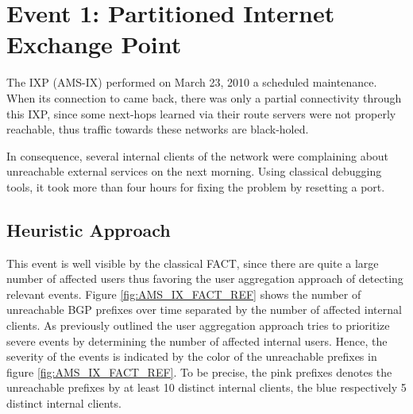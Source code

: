 \section{Event 1: Partitioned Internet Exchange Point}

The IXP \citet{AMS-IX}(AMS-IX) performed on March 23, 2010 a scheduled maintenance. When its connection to \citet{switch} came back, there was only a partial connectivity through this IXP, since some next-hops learned via their route servers were not properly reachable, thus traffic towards these networks are black-holed.\citep{SchatzmannPAM2011}

In consequence, several internal clients of the \citet{switch} network were complaining about unreachable external services on the next morning. Using classical debugging tools, it took more than four hours for fixing the problem by resetting a port.\citep{SchatzmannPAM2011}

\subsection{Heuristic Approach} This event is well visible by the classical FACT, since there are quite a large number of affected users thus favoring the user aggregation approach of detecting relevant events. Figure \ref{fig:AMS_IX_FACT_REF} shows the number of unreachable BGP prefixes over time separated by the number of affected internal clients. As previously outlined the user aggregation approach tries to prioritize severe events by determining the number of affected internal users. 
Hence, the severity of the events is indicated by the color of the unreachable prefixes in figure \ref{fig:AMS_IX_FACT_REF}. To be precise, the pink prefixes denotes the unreachable prefixes by at least 10 distinct internal clients, the blue respectively 5 distinct internal clients.


